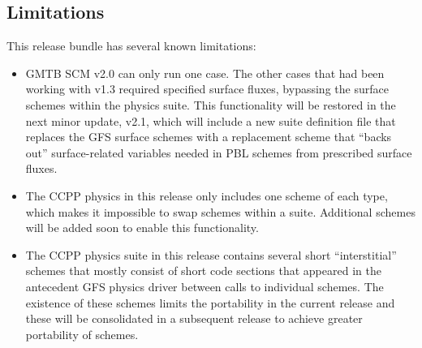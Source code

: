 \subsection{Limitations}

This release bundle has several known limitations:

\begin{itemize}
\item GMTB SCM v2.0 can only run one case. The other cases that had been working with v1.3 required specified surface fluxes, bypassing the surface schemes within the physics suite. This functionality will be restored in the next minor update, v2.1, which will include a new suite definition file that replaces the GFS surface schemes with a replacement scheme that ``backs out'' surface-related variables needed in PBL schemes from prescribed surface fluxes.
\item The CCPP physics in this release only includes one scheme of each type, which makes it impossible to swap schemes within a suite. Additional schemes will be added soon to enable this functionality.
\item The CCPP physics suite in this release contains several short ``interstitial'' schemes that mostly consist of short code sections that appeared in the antecedent GFS physics driver between calls to individual schemes. The existence of these schemes limits the portability in the current release and these will be consolidated in a subsequent release to achieve greater portability of schemes.
\end{itemize}
